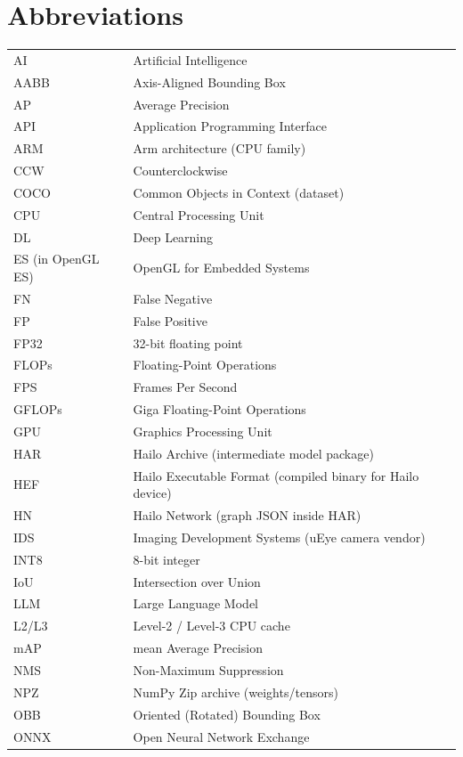 \documentclass[12pt,a4paper]{report}
\begin{document}
\chapter*{Abbreviations}
\begin{longtable}{@{}p{3cm}p{10cm}@{}}
AI & Artificial Intelligence \\
AABB & Axis-Aligned Bounding Box \\
AP & Average Precision \\
API & Application Programming Interface \\
ARM & Arm architecture (CPU family) \\
CCW & Counterclockwise \\
COCO & Common Objects in Context (dataset) \\
CPU & Central Processing Unit \\
DL & Deep Learning \\
ES (in OpenGL ES) & OpenGL for Embedded Systems \\
FN & False Negative \\
FP & False Positive \\
FP32 & 32-bit floating point \\
FLOPs & Floating-Point Operations \\
FPS & Frames Per Second \\
GFLOPs & Giga Floating-Point Operations \\
GPU & Graphics Processing Unit \\
HAR & Hailo Archive (intermediate model package) \\
HEF & Hailo Executable Format (compiled binary for Hailo device) \\
HN & Hailo Network (graph JSON inside HAR) \\
IDS & Imaging Development Systems (uEye camera vendor) \\
INT8 & 8-bit integer \\
IoU & Intersection over Union \\
LLM & Large Language Model \\
L2/L3 & Level-2 / Level-3 CPU cache \\
mAP & mean Average Precision \\
NMS & Non-Maximum Suppression \\
NPZ & NumPy Zip archive (weights/tensors) \\
OBB & Oriented (Rotated) Bounding Box \\
ONNX & Open Neural Network Exchange \\

\end{longtable}
\end{document}
